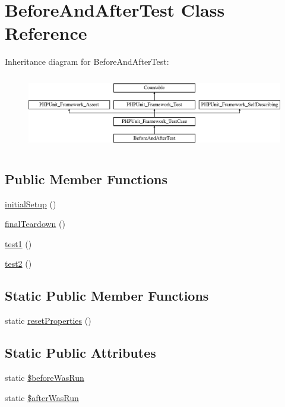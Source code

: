 \hypertarget{class_before_and_after_test}{}\section{Before\+And\+After\+Test Class Reference}
\label{class_before_and_after_test}
Inheritance diagram for Before\+And\+After\+Test\+:\begin{figure}[H]
\begin{center}
\leavevmode
\includegraphics[height=3.303835cm]{class_before_and_after_test}
\end{center}
\end{figure}
\subsection*{Public Member Functions}
\begin{DoxyCompactItemize}
\item 
\mbox{\hyperlink{class_before_and_after_test_a2d08757c44fce58e8d9e57a66f4d62c6}{initial\+Setup}} ()
\item 
\mbox{\hyperlink{class_before_and_after_test_a4bde3359a9efdeb902db2747d66e5ae3}{final\+Teardown}} ()
\item 
\mbox{\hyperlink{class_before_and_after_test_a9e2276037cf701ed1bf0dba589e19c51}{test1}} ()
\item 
\mbox{\hyperlink{class_before_and_after_test_ac1e2d86a33f7b563e1d5e317974d9074}{test2}} ()
\end{DoxyCompactItemize}
\subsection*{Static Public Member Functions}
\begin{DoxyCompactItemize}
\item 
static \mbox{\hyperlink{class_before_and_after_test_a005afccec5fc30c336e4d5d9287760a6}{reset\+Properties}} ()
\end{DoxyCompactItemize}
\subsection*{Static Public Attributes}
\begin{DoxyCompactItemize}
\item 
static \mbox{\hyperlink{class_before_and_after_test_a0a0cbad406a07ae35f05837a8c5d0a24}{\$before\+Was\+Run}}
\item 
static \mbox{\hyperlink{class_before_and_after_test_ad3fb12bb3deccd702be71cf4d53aa3fc}{\$after\+Was\+Run}}
\end{DoxyCompactItemize}
